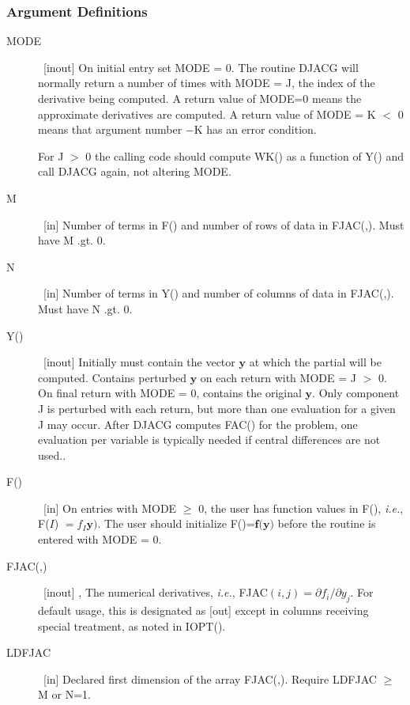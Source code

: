 \documentclass[twoside]{MATH77}
\begin{document}
\subsubsection{Argument Definitions}

\begin{description}
\item[MODE]  \ [inout] On initial entry set MODE = 0. The routine DJACG
 will normally return a number of times with MODE = J,
 the index of the derivative being computed.  A return value of MODE=0 means
 the approximate derivatives are computed.  A return value of MODE = K $<$ 0
 means that argument number $-$K has an error condition.

 For J $>$ 0 the calling code should compute WK() as a
function of Y() and call DJACG again, not altering MODE.

\item[M]  \ [in] Number of terms in F() and number of rows of data in
FJAC(,).  Must have M .gt. 0.

\item[N]  \ [in] Number of terms in Y() and number of columns of data in
FJAC(,).  Must have N .gt. 0.

\item[Y()] \ [inout] Initially must contain the vector $\mathbf{y}$ at which
  the partial will be computed. Contains perturbed $\mathbf{y}$ on each return
  with MODE = J $>$ 0. On final return with MODE = 0, contains the original
  $\mathbf{y}$.  Only component J is perturbed with each return, but more than
  one evaluation for a given J may occur.  After DJACG computes FAC() for the
  problem, one evaluation per variable is typically needed if central
  differences are not used..

\item[F()] \ [in] On entries with MODE $\geq $ 0, the user has function
  values in F(), {\em i.e.}, F($I$) $=f_I \mathbf{y}).$ The user
  should initialize F()=$\mathbf{f}(\mathbf{y)}$ before the routine is
  entered with MODE = 0.

\item[FJAC(,)]  \ [inout] , The numerical derivatives, {\em i.e.},
 FJAC$(i,j)=\partial f_i/\partial y_j$.  For default usage, 
 this is designated as [out] except in columns
 receiving special treatment, as noted in IOPT().

\item[LDFJAC]  \ [in] Declared first dimension of the array FJAC(,).
 Require LDFJAC $\geq $ M or N=1.


\end{description}
\end{document}
